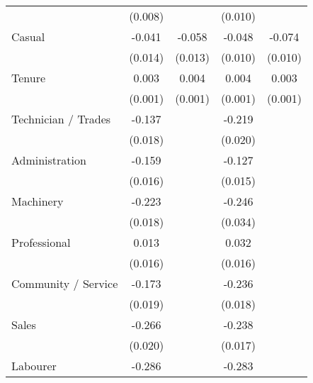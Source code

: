 {\begin{tabular}{l*{4}{c}}
                    &     (0.008)         &                     &     (0.010)         &                     \\
Casual              &      -0.041\sym{***}&      -0.058\sym{***}&      -0.048\sym{***}&      -0.074\sym{***}\\
                    &     (0.014)         &     (0.013)         &     (0.010)         &     (0.010)         \\
Tenure              &       0.003\sym{***}&       0.004\sym{***}&       0.004\sym{***}&       0.003\sym{***}\\
                    &     (0.001)         &     (0.001)         &     (0.001)         &     (0.001)         \\
Technician / Trades &      -0.137\sym{***}&                     &      -0.219\sym{***}&                     \\
                    &     (0.018)         &                     &     (0.020)         &                     \\
Administration      &      -0.159\sym{***}&                     &      -0.127\sym{***}&                     \\
                    &     (0.016)         &                     &     (0.015)         &                     \\
Machinery           &      -0.223\sym{***}&                     &      -0.246\sym{***}&                     \\
                    &     (0.018)         &                     &     (0.034)         &                     \\
Professional        &       0.013         &                     &       0.032\sym{**} &                     \\
                    &     (0.016)         &                     &     (0.016)         &                     \\
Community / Service &      -0.173\sym{***}&                     &      -0.236\sym{***}&                     \\
                    &     (0.019)         &                     &     (0.018)         &                     \\
Sales               &      -0.266\sym{***}&                     &      -0.238\sym{***}&                     \\
                    &     (0.020)         &                     &     (0.017)         &                     \\
Labourer            &      -0.286\sym{***}&                     &      -0.283\sym{***}&                     \\

\end{tabular}}
